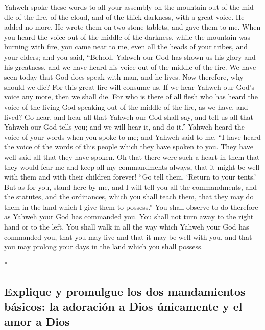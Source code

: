 \begin{paracol}{2}
\begin{otherlanguage}{english}
 Yahweh spoke these words to all your assembly on the
mountain out of the middle of the fire, of the cloud, and of the thick
darkness, with a great voice. He added no more. He wrote them on two
stone tablets, and gave them to me.  When you heard the
voice out of the middle of the darkness, while the mountain was burning
with fire, you came near to me, even all the heads of your tribes, and
your elders;  and you said, ``Behold, Yahweh our God has
shown us his glory and his greatness, and we have heard his voice out of
the middle of the fire. We have seen today that God does speak with man,
and he lives.  Now therefore, why should we die? For this
great fire will consume us. If we hear Yahweh our God's voice any more,
then we shall die.  For who is there of all flesh who has
heard the voice of the living God speaking out of the middle of the
fire, as we have, and lived?  Go near, and hear all that
Yahweh our God shall say, and tell us all that Yahweh our God tells you;
and we will hear it, and do it.''  Yahweh heard the voice
of your words when you spoke to me; and Yahweh said to me, ``I have
heard the voice of the words of this people which they have spoken to
you. They have well said all that they have spoken.  Oh
that there were such a heart in them that they would fear me and keep
all my commandments always, that it might be well with them and with
their children forever!  ``Go tell them, `Return to your
tents.'  But as for you, stand here by me, and I will
tell you all the commandments, and the statutes, and the ordinances,
which you shall teach them, that they may do them in the land which I
give them to possess.''  You shall observe to do
therefore as Yahweh your God has commanded you. You shall not turn away
to the right hand or to the left.  You shall walk in all
the way which Yahweh your God has commanded you, that you may live and
that it may be well with you, and that you may prolong your days in the
land which you shall possess.

\end{otherlanguage}

\switchcolumn[0]*

\hypertarget{explique-y-promulgue-los-dos-mandamientos-buxe1sicos-la-adoraciuxf3n-a-dios-uxfanicamente-y-el-amor-a-dios}{%
\subsection{Explique y promulgue los dos mandamientos básicos: la
adoración a Dios únicamente y el amor a
Dios}\label{explique-y-promulgue-los-dos-mandamientos-buxe1sicos-la-adoraciuxf3n-a-dios-uxfanicamente-y-el-amor-a-dios}}


\end{paracol}
